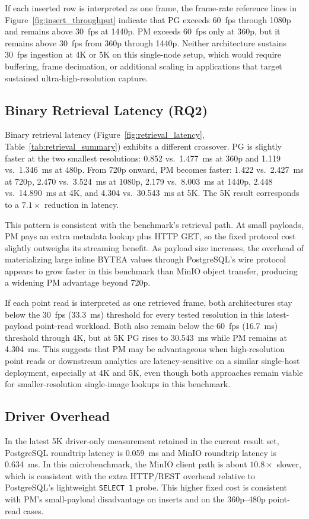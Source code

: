 \documentclass[conference, a4paper]{IEEEtran}
\begin{document}
If each inserted row is interpreted as one frame, the frame-rate reference lines in Figure~\ref{fig:insert_throughput} indicate that PG exceeds 60~fps through 1080p and remains above 30~fps at 1440p. PM exceeds 60~fps only at 360p, but it remains above 30~fps from 360p through 1440p. Neither architecture sustains 30~fps ingestion at 4K or 5K on this single-node setup, which would require buffering, frame decimation, or additional scaling in applications that target sustained ultra-high-resolution capture.

\subsection{Binary Retrieval Latency (RQ2)}
\label{subsec:retrieval_latency}
Binary retrieval latency (Figure~\ref{fig:retrieval_latency}, Table~\ref{tab:retrieval_summary}) exhibits a different crossover. PG is slightly faster at the two smallest resolutions: 0.852 vs.\ 1.477~ms at 360p and 1.119 vs.\ 1.346~ms at 480p. From 720p onward, PM becomes faster: 1.422 vs.\ 2.427~ms at 720p, 2.470 vs.\ 3.524~ms at 1080p, 2.179 vs.\ 8.003~ms at 1440p, 2.448 vs.\ 14.890~ms at 4K, and 4.304 vs.\ 30.543~ms at 5K. The 5K result corresponds to a $7.1\times$ reduction in latency.

This pattern is consistent with the benchmark's retrieval path. At small payloads, PM pays an extra metadata lookup plus HTTP GET, so the fixed protocol cost slightly outweighs its streaming benefit. As payload size increases, the overhead of materializing large inline BYTEA values through PostgreSQL's wire protocol appears to grow faster in this benchmark than MinIO object transfer, producing a widening PM advantage beyond 720p.

If each point read is interpreted as one retrieved frame, both architectures stay below the 30~fps (33.3~ms) threshold for every tested resolution in this latest-payload point-read workload. Both also remain below the 60~fps (16.7~ms) threshold through 4K, but at 5K PG rises to 30.543~ms while PM remains at 4.304~ms. This suggests that PM may be advantageous when high-resolution point reads or downstream analytics are latency-sensitive on a similar single-host deployment, especially at 4K and 5K, even though both approaches remain viable for smaller-resolution single-image lookups in this benchmark.

\subsection{Driver Overhead}
\label{subsec:driver_overhead}
In the latest 5K driver-only measurement retained in the current result set, PostgreSQL roundtrip latency is 0.059~ms and MinIO roundtrip latency is 0.634~ms. In this microbenchmark, the MinIO client path is about $10.8\times$ slower, which is consistent with the extra HTTP/REST overhead relative to PostgreSQL's lightweight \texttt{SELECT 1} probe. This higher fixed cost is consistent with PM's small-payload disadvantage on inserts and on the 360p--480p point-read cases.
\end{document}

